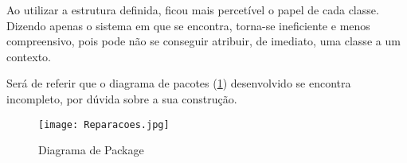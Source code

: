 \documentclass[../relatorio.tex]{subfiles}
\begin{document}
Ao utilizar a estrutura definida, ficou mais percetível o papel de cada classe.
Dizendo apenas o sistema em que se encontra, torna-se ineficiente e menos compreensivo,
pois pode não se conseguir atribuir, de imediato, uma classe a um contexto.

Será de referir que o diagrama de pacotes (\ref{img:diagrama_package}) desenvolvido se encontra
incompleto, por dúvida sobre a sua construção.

\begin{figure}[!ht]
    \centering
    \texttt{[image: Reparacoes.jpg]}
    \caption{Diagrama de Package} \label{img:diagrama_package}
\end{figure}
\end{document}

